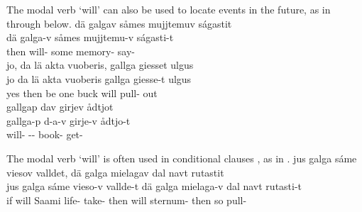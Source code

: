 The modal verb  ‘will’ can also be used to locate events in the future, as in  through  below.
\ea\label{future1}%
\glll	dä galgav såmes mujjtemuv ságastit\\
	dä galga-v såmes mujjtemu-v ságasti-t\\
	then will- some memory- say-\\\nopagebreak
{} 
\z
\ea\label{future2}%
\glll	jo, da lä akta vuoberis, gallga giesset ulgus\\
	jo da lä akta {vuoberis\footnotemark} gallga giesse-t ulgus\\
	yes then be\BS{} one buck\BS{} will\BS{} pull- out\\\nopagebreak
{} 
\z
\ea\label{future3}%
\glll	gallgap dav girjev ådtjot\\
	gallga-p d-a-v girje-v ådtjo-t\\
	will- -- book- get-\\\nopagebreak
{} 
\z

The modal verb  ‘will’ is often used in conditional clauses%
, as in .
\ea\label{condClause1}%
\glll	jus galga sáme viesov valldet, dä galga mielagav dal navt rutastit\\
	jus galga sáme vieso-v vallde-t dä galga mielaga-v dal navt rutasti-t\\
	if will\BS{} Saami\BS{} life- take- then will\BS{} sternum- then so pull-\\\nopagebreak
{} 
\z


